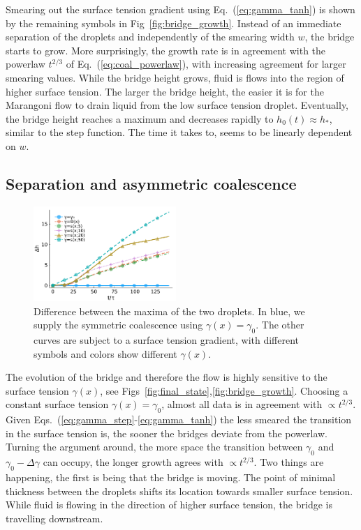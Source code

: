 \documentclass[twocolumn,amsmath,amssymb,showpacs,pre,nofootinbib,superscriptaddress]{revtex4-1} %
\begin{document}
Smearing out the surface tension gradient using Eq.~(\ref{eq:gamma_tanh}) is shown by the remaining symbols in Fig~\ref{fig:bridge_growth}.
Instead of an immediate separation of the droplets and independently of the smearing width $w$, the bridge starts to grow.
More surprisingly, the growth rate is in agreement with the powerlaw $t^{2/3}$ of Eq.~(\ref{eq:coal_powerlaw}), with increasing agreement for larger smearing values.
While the bridge height grows, fluid is flows into the region of higher surface tension.
The larger the bridge height, the easier it is for the Marangoni flow to drain liquid from the low surface tension droplet.
Eventually, the bridge height reaches a maximum and decreases rapidly to $h_0(t) \approx h_{\ast}$, similar to the step function.
The time it takes to,  seems to be linearly dependent on $w$.

\subsection{Separation and asymmetric coalescence}\label{subsec:separation}
\begin{figure}
    \centering
    \includegraphics[width=0.48\textwidth]{Figures/hdiff.pdf}
    \caption{Difference between the maxima of the two droplets.
    In blue, we supply the symmetric coalescence using $\gamma(x) = \gamma_0$.
    The other curves are subject to a surface tension gradient, with different symbols and colors show different $\gamma(x)$.
    }
    \label{fig:drop_diff}
\end{figure}
The evolution of the bridge and therefore the flow is highly sensitive to the surface tension $\gamma(x)$, see Figs~\ref{fig:final_state},\ref{fig:bridge_growth}.
Choosing a constant surface tension $\gamma(x) = \gamma_0$, almost all data is in agreement with $\propto t^{2/3}$.
Given Eqs.~(\ref{eq:gamma_step}-\ref{eq:gamma_tanh}) the less smeared the transition in the surface tension is, the sooner the bridges deviate from the powerlaw.
Turning the argument around, the more space the transition between $\gamma_0$ and $\gamma_0-\Delta\gamma$ can occupy, the longer growth agrees with $\propto t^{2/3}$.
Two things are happening, the first is being that the bridge is moving.
The point of minimal thickness between the droplets shifts its location towards smaller surface tension.
While fluid is flowing in the direction of higher surface tension, the bridge is travelling downstream.
\end{document}
